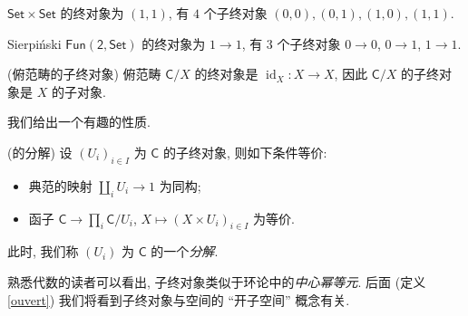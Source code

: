 \begin{example}
	{}
	$\mathsf {Set}\times\mathsf {Set}$ 的终对象为 $(1,1)$, 有 $4$ 个子终对象 $(0,0),(0,1),(1,0),(1,1)$.
	
	Sierpi\'nski\topos{} $\mathsf {Fun}(\mathsf 2,\mathsf {Set})$ 的终对象为 $1\to 1$, 有 $3$ 个子终对象 $0\to 0$, $0\to 1$, $1\to 1$.
\end{example}

\begin{example}
	{(俯范畴的子终对象)}
	俯范畴 $\mathsf C/X$ 的终对象是 $\operatorname{id}_X\colon X\to X$, 因此 $\mathsf C/X$ 的子终对象是 $X$ 的子对象.
\end{example}

我们给出一个有趣的性质.

\begin{propdef}
	{(\topos{}的分解)}
	设 $(U_i)_{i\in I}$ 为\topos{} $\mathsf C$ 的子终对象, 则如下条件等价:
	\begin{itemize}
		\item 典范的映射 $\coprod_i U_i \to 1$ 为同构;
		\item 函子 $\mathsf C \to \prod_i \mathsf C/U_i$, $X\mapsto (X\times U_i)_{i\in I}$ 为等价.
	\end{itemize}
	此时, 我们称 $(U_i)$ 为\topos{} $\mathsf C$ 的一个\emph{分解}.
\end{propdef}

\begin{remark}
	{}
	熟悉代数的读者可以看出, 子终对象类似于环论中的\emph{中心幂等元}. 后面 (定义 \ref{ouvert}) 我们将看到子终对象与空间的 ``开子空间'' 概念有关.
\end{remark}